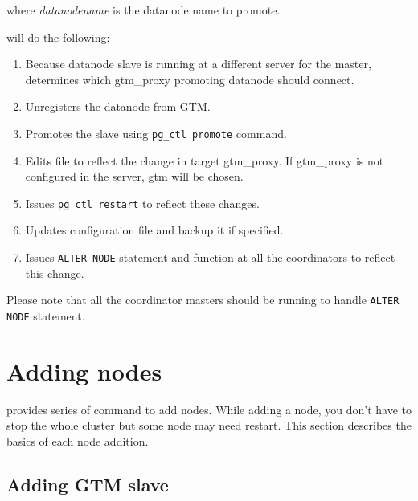   where {\it datanodename} is the datanode name to promote.
  
   will do the following:
  
  \begin{enumerate}
	  \item Because datanode slave is running at a different server for the master,
	  		determines which gtm\_proxy promoting datanode should connect.
	  \item Unregisters the datanode from GTM.
	  \item Promotes the slave using \texttt{pg\_ctl promote} command.
	  \item Edits  file to reflect the change in target gtm\_proxy.
	  		If gtm\_proxy is not configured in the server, gtm will be chosen.
	  \item Issues \texttt{pg\_ctl restart} to reflect these changes.
	  \item Updates  configuration file and backup it if specified.
	  \item Issues \texttt{ALTER NODE} statement and  function at all
	  		the coordinators to reflect this change.
  \end{enumerate}
  
  Please note that all the coordinator masters should be running to handle \verb|ALTER NODE| statement.



%
%
\chapter{Adding nodes}

   provides series of command to add nodes.
  While adding a node, you don't have to stop the whole \XC{} cluster but some node may
  need restart.
  This section describes the basics of each node addition.



\section{Adding GTM slave}

